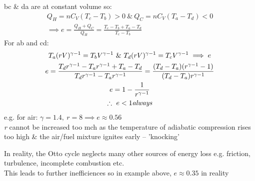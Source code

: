 \documentclass[a4paper, 11pt, fleqn, normalem]{report}
\begin{document}
bc \& da are at constant volume so:
\begin{gather*}
	Q_{H} = nC_{V}(T_{c} - T_{b}) > 0 ~\&~ Q_{C} = nC_{V}(T_{a} - T_{d}) < 0 \\
	\implies e = \frac{Q_{H} + Q_{C}}{Q_{H}} = \frac{T_{c} - T_{b} + T_{a} - T_{d}}{T_{c} - T_{b}}
\end{gather*}
For ab and cd:
\begin{gather*}
	T_{a}(rV)^{\gamma - 1} = T_{b}V^{\gamma - 1} ~\&~ T_{d}(rV)^{\gamma - 1} = T_{c}V^{\gamma - 1} \implies e \\
	e = \frac{T_{d}r^{\gamma - 1} - T_{a}r^{\gamma - 1} + T_{a} - T_{d}}{T_{d}r^{\gamma - 1} - T_{a}r^{\gamma - 1}} = \frac{(T_{d} - T_{a})(r^{\gamma - 1} - 1)}{(T_{d} - T_{a})r^{\gamma - 1}} \\
	e = 1 - \frac{1}{r^{\gamma - 1}} \\
	\therefore ~ e < 1 \emph{always}
\end{gather*}
e.g. for air: $\gamma = 1.4, ~ r = 8 \implies e \approx 0.56$ \\
\emph{r} cannot be increased too mch as the temperature of adiabatic compression rises too high \& the air/fuel mixture ignites early -- 'knocking'

In reality, the Otto cycle neglects many other sources of energy loss e.g. friction, turbulence, incomplete combustion etc. \\
This leads to further inefficiences so in example above, $e \approx 0.35$ in reality
\end{document}
